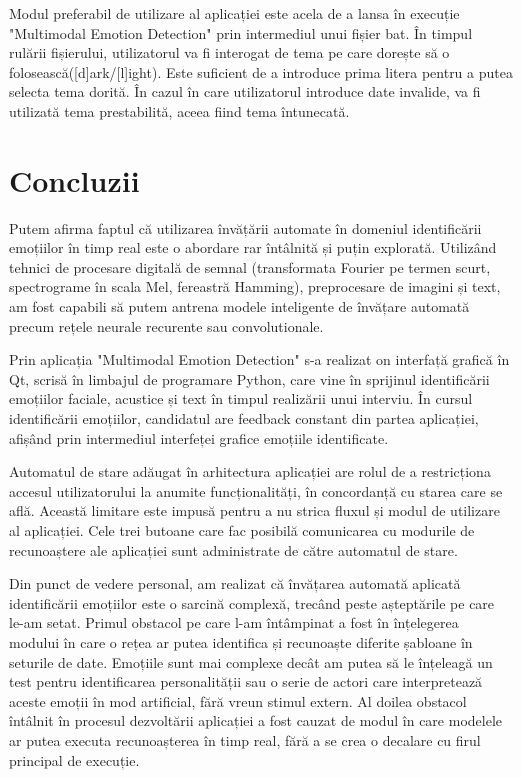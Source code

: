 \documentclass[a4paper, 12pt]{report}
\begin{document}
	Modul preferabil de utilizare al aplicației este acela de a lansa în execuție "Multimodal Emotion Detection" prin intermediul unui fișier bat. În timpul rulării fișierului, utilizatorul va fi interogat de tema pe care dorește să o folosească([d]ark/[l]ight). Este suficient de a introduce prima litera pentru a putea selecta tema dorită. În cazul în care utilizatorul introduce date invalide, va fi utilizată tema prestabilită, aceea fiind tema întunecată.

	\clearpage
	\section{Concluzii}
	Putem afirma faptul că utilizarea învățării automate în domeniul identificării emoțiilor în timp real este o abordare rar întâlnită și puțin explorată. Utilizând tehnici de procesare digitală de semnal (transformata Fourier pe termen scurt, spectrograme în scala Mel, fereastră Hamming), preprocesare de imagini și text, am fost capabili să putem antrena modele inteligente de învățare automată precum rețele neurale recurente sau convolutionale.

	Prin aplicația "Multimodal Emotion Detection" s-a realizat on interfață grafică în Qt, scrisă în limbajul de programare Python, care vine în sprijinul identificării emoțiilor faciale, acustice și text în timpul realizării unui interviu. În cursul identificării emoțiilor, candidatul are feedback constant din partea aplicației, afișând prin intermediul interfeței grafice emoțiile identificate. 

	Automatul de stare adăugat în arhitectura aplicației are rolul de a restricționa accesul utilizatorului la anumite funcționalități, în concordanță cu starea care se află. Această limitare este impusă pentru a nu strica fluxul și modul de utilizare al aplicației. Cele trei butoane care fac posibilă comunicarea cu modurile de recunoaștere ale aplicației sunt administrate de către automatul de stare.

	Din punct de vedere personal, am realizat că învățarea automată aplicată identificării emoțiilor este o sarcină complexă, trecând peste așteptările pe care le-am setat. Primul obstacol pe care l-am întâmpinat a fost în înțelegerea modului în care o rețea ar putea identifica și recunoaște diferite șabloane în seturile de date. Emoțiile sunt mai complexe decât am putea să le înțeleagă un test pentru identificarea personalității sau o serie de actori care interpretează aceste emoții în mod artificial, fără vreun stimul extern. Al doilea obstacol întâlnit în procesul dezvoltării aplicației a fost cauzat de modul în care modelele ar putea executa recunoașterea în timp real, fără a se crea o decalare cu firul principal de execuție.
\end{document}
